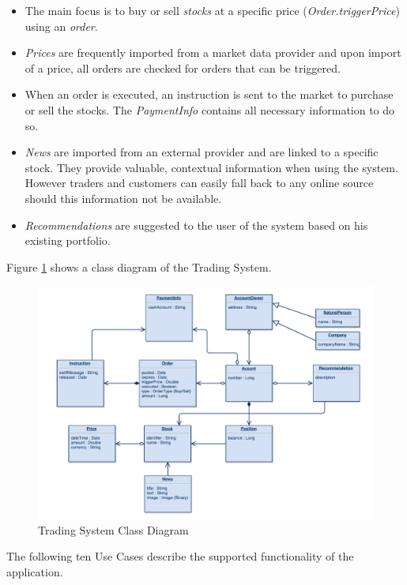 \begin{itemize}
\item The main focus is to buy or sell \textit{stocks} at a specific price (\textit{Order.triggerPrice}) using an \textit{order}.
\item \textit{Prices} are frequently imported from a market data provider and upon import of a price, all orders are checked for orders that can be triggered.
\item When an order is executed, an instruction is sent to the market to purchase or sell the stocks. The \textit{PaymentInfo} contains all necessary information to do so. 
\item \textit{News} are imported from an external provider and are linked to a specific stock. They provide valuable, contextual information when using the system. However traders and customers can easily fall back to any online source should this information not be available.
\item \textit{Recommendations} are suggested to the user of the system based on his existing portfolio.
\end{itemize}

Figure \ref{fig:tradingClasses} shows a class diagram of the Trading System.

\begin{figure}[H]
	\includegraphics[scale=0.5]{diagrams/TradingSystem.pdf}
	\caption{Trading System Class Diagram}
	\label{fig:tradingClasses}
\end{figure}

The following ten Use Cases describe the supported functionality of the application.

